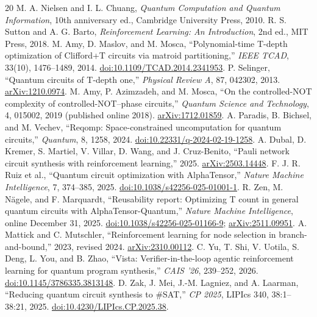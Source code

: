 \documentclass[11pt]{article}
\theoremstyle{definition}\newtheorem{definition}[theorem]{Definition}
\begin{document}
\begin{thebibliography}{20}
 M. A. Nielsen and I. L. Chuang, \emph{Quantum Computation and Quantum Information}, 10th anniversary ed., Cambridge University Press, 2010.
 R. S. Sutton and A. G. Barto, \emph{Reinforcement Learning: An Introduction}, 2nd ed., MIT Press, 2018.
 M. Amy, D. Maslov, and M. Mosca, ``Polynomial-time T-depth optimization of Clifford+T circuits via matroid partitioning,'' \emph{IEEE TCAD}, 33(10), 1476--1489, 2014. \href{https://doi.org/10.1109/TCAD.2014.2341953}{doi:10.1109/TCAD.2014.2341953}.
 P. Selinger, ``Quantum circuits of T-depth one,'' \emph{Physical Review A}, 87, 042302, 2013. \href{https://arxiv.org/abs/1210.0974}{arXiv:1210.0974}.
 M. Amy, P. Azimzadeh, and M. Mosca, ``On the controlled-NOT complexity of controlled-NOT--phase circuits,'' \emph{Quantum Science and Technology}, 4, 015002, 2019 (published online 2018). \href{https://arxiv.org/abs/1712.01859}{arXiv:1712.01859}.
 A. Paradis, B. Bichsel, and M. Vechev, ``Reqomp: Space-constrained uncomputation for quantum circuits,'' \emph{Quantum}, 8, 1258, 2024. \href{https://doi.org/10.22331/q-2024-02-19-1258}{doi:10.22331/q-2024-02-19-1258}.
 A. Dubal, D. Kremer, S. Martiel, V. Villar, D. Wang, and J. Cruz-Benito, ``Pauli network circuit synthesis with reinforcement learning,'' 2025. \href{https://arxiv.org/abs/2503.14448}{arXiv:2503.14448}.
 F. J. R. Ruiz et al., ``Quantum circuit optimization with AlphaTensor,'' \emph{Nature Machine Intelligence}, 7, 374--385, 2025. \href{https://doi.org/10.1038/s42256-025-01001-1}{doi:10.1038/s42256-025-01001-1}.
 R. Zen, M. N\"agele, and F. Marquardt, ``Reusability report: Optimizing T count in general quantum circuits with AlphaTensor-Quantum,'' \emph{Nature Machine Intelligence}, online December 31, 2025. \href{https://doi.org/10.1038/s42256-025-01166-9}{doi:10.1038/s42256-025-01166-9}; \href{https://arxiv.org/abs/2511.09951}{arXiv:2511.09951}.
 A. Mattick and C. Mutschler, ``Reinforcement learning for node selection in branch-and-bound,'' 2023, revised 2024. \href{https://arxiv.org/abs/2310.00112}{arXiv:2310.00112}.
 C. Yu, T. Shi, V. Uotila, S. Deng, L. You, and B. Zhao, ``Vista: Verifier-in-the-loop agentic reinforcement learning for quantum program synthesis,'' \emph{CAIS '26}, 239--252, 2026. \href{https://doi.org/10.1145/3786335.3813148}{doi:10.1145/3786335.3813148}.
 D. Zak, J. Mei, J.-M. Lagniez, and A. Laarman, ``Reducing quantum circuit synthesis to \#SAT,'' \emph{CP 2025}, LIPIcs 340, 38:1--38:21, 2025. \href{https://doi.org/10.4230/LIPIcs.CP.2025.38}{doi:10.4230/LIPIcs.CP.2025.38}.

\end{thebibliography}
\end{document}
